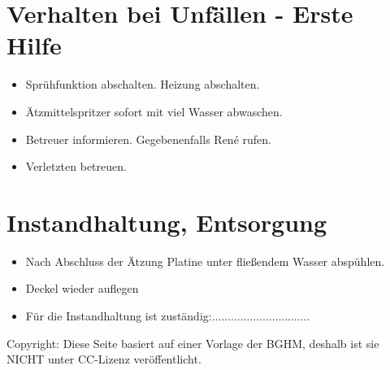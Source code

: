 \documentclass[fontsize=9pt]{scrartcl}
\newenvironment{smallitemize}{\begin{itemize}\itemsep -3pt}{\end{itemize}}
\begin{document}
\section{Verhalten bei Unfällen - Erste Hilfe}
\begin{smallitemize}
	\item Sprühfunktion abschalten. Heizung abschalten.
	\item Ätzmittelspritzer sofort mit viel Wasser abwaschen.
	\item Betreuer informieren. Gegebenenfalls René rufen.
	\item Verletzten betreuen.
\end{smallitemize}

\section{Instandhaltung, Entsorgung}
\begin{smallitemize}
	\item Nach Abschluss der Ätzung Platine unter fließendem Wasser abspühlen.
	\item Deckel wieder auflegen 
		\vspace{5mm}
	\item Für die Instandhaltung ist zuständig:...............................
\end{smallitemize}
\vfill
Copyright:  Diese Seite basiert auf einer Vorlage der BGHM, deshalb ist sie NICHT unter CC-Lizenz veröffentlicht.
\end{document}
